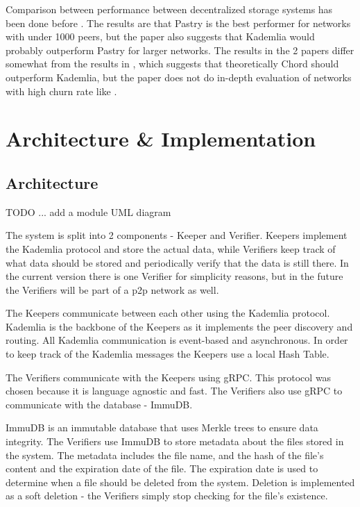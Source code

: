 \documentclass[ twoside,openright,titlepage,numbers=noenddot,headinclude,%
                footinclude=true,cleardoublepage=empty,abstractoff, %
                BCOR=5mm,paper=a4,fontsize=11pt,%
                ngerman,american,%
                ]{scrreprt}
\begin{document}
Comparison between performance between decentralized storage systems has been done before
\cite{kadvschordvspastry, 2019AIPC.2129b0131A}.
The results are that Pastry is the best performer for networks with under 1000 peers, but the paper also suggests
that Kademlia would probably outperform Pastry for larger networks.
The results in the 2 papers differ somewhat from the results in \cite{compstudy}, which suggests that theoretically
Chord should outperform Kademlia, but the paper does not do in-depth evaluation of networks with high churn rate
like \cite{kadvschordvspastry}.

\chapter{Architecture \& Implementation}
\label{cha:arch-impl}

\section{Architecture}
\label{sec:architecture}

TODO ... add a module UML diagram

The system is split into 2 components - Keeper and Verifier.
Keepers implement the Kademlia protocol and store the actual data,
while Verifiers keep track of what data should be stored and periodically verify that the data is still there.
In the current version there is one Verifier for simplicity reasons,
but in the future the Verifiers will be part of a p2p network as well.

The Keepers communicate between each other using the Kademlia protocol.
Kademlia is the backbone of the Keepers as it implements the peer discovery and routing.
All Kademlia communication is event-based and asynchronous.
In order to keep track of the Kademlia messages the Keepers use a local Hash Table.

The Verifiers communicate with the Keepers using gRPC.
This protocol was chosen because it is language agnostic and fast.
The Verifiers also use gRPC to communicate with the database - ImmuDB.

ImmuDB is an immutable database that uses Merkle trees to ensure data integrity.
The Verifiers use ImmuDB to store metadata about the files stored in the system.
The metadata includes the file name, and the hash of the file's content and the expiration date of the file.
The expiration date is used to determine when a file should be deleted from the system.
Deletion is implemented as a soft deletion - the Verifiers simply stop checking for the file's existence.
\end{document}
